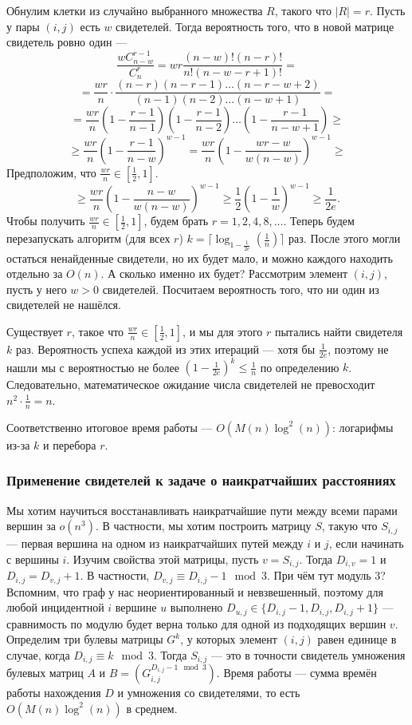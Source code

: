 Обнулим клетки из случайно выбранного множества $R$, такого что $|R| = r$.
Пусть у пары $(i, j)$ есть $w$ свидетелей.
Тогда вероятность того, что в новой матрице свидетель ровно один ---
\[
    \frac{w C_{n-w}^{r-1}}{C_n^r} = wr \frac{(n-w)! (n-r)!}{n! (n-w-r+1)!} = 
\]
\[
    = \frac{wr}{n} \cdot \frac{(n-r)(n-r-1) \dots (n-r-w+2)}{(n-1)(n-2) \dots (n-w+1)} =
\]
\[
    = \frac{wr}{n} \left(1 - \frac{r-1}{n-1} \right) \left(1 - \frac{r-1}{n-2} \right) \dots \left(1 - \frac{r-1}{n-w+1} \right) \ge
\]
\[
    \ge \frac{wr}{n} \left(1 - \frac{r-1}{n-w} \right)^{w-1} = \frac{wr}{n} \left( 1 - \frac{wr - w}{w(n - w)} \right)^{w - 1} \ge
\]
Предположим, что $\frac{wr}{n} \in \left[ \frac{1}{2}, 1 \right]$.
\[
    \ge \frac{wr}{n} \left( 1 - \frac{n - w}{w(n - w)} \right)^{w-1} \ge \frac{1}{2} \left(1 - \frac{1}{w} \right)^{w-1} \ge \frac{1}{2e}.
\]
Чтобы получить $\frac{wr}{n} \in \left[ \frac{1}{2}, 1 \right]$, будем брать $r = 1, 2, 4, 8, \dots$.
Теперь будем перезапускать алгоритм (для всех $r$) $k = \lceil \log_{1 - \frac{1}{2e}} \left( \frac{1}{n} \right) \rceil$ раз.
После этого могли остаться ненайденные свидетели, но их будет мало, и можно каждого находить отдельно за $O(n)$.
А сколько именно их будет?
Рассмотрим элемент $(i, j)$, пусть у него $w > 0$ свидетелей.
Посчитаем вероятность того, что ни один из свидетелей не нашёлся.

Существует $r$, такое что $\frac{wr}{n} \in \left[ \frac{1}{2}, 1 \right]$, и мы для этого $r$ пытались найти свидетеля $k$ раз.
Вероятность успеха каждой из этих итераций --- хотя бы $\frac{1}{2e}$, поэтому не нашли мы с вероятностью не более $\left(1 - \frac{1}{2e} \right)^k \le \frac{1}{n}$ по определению $k$.
Следовательно, математическое ожидание числа свидетелей не превосходит $n^2 \cdot \frac{1}{n} = n$.

Соответственно итоговое время работы --- $O(M(n) \log^2(n))$: логарифмы из-за $k$ и перебора $r$.

\subsubsection{Применение свидетелей к задаче о наикратчайших расстояниях}
Мы хотим научиться восстанавливать наикратчайшие пути между всеми парами вершин за $o(n^3)$.
В частности, мы хотим построить матрицу $S$, такую что $S_{i,j}$ --- первая вершина на одном из наикратчайших путей между $i$ и $j$, если начинать с вершины $i$.
Изучим свойства этой матрицы, пусть $v = S_{i,j}$.
Тогда $D_{i,v} = 1$ и $D_{i,j} = D_{v,j} + 1$.
В частности, $D_{v,j} \equiv D_{i,j} - 1 \mod 3$.
При чём тут модуль 3?
Вспомним, что граф у нас неориентированный и невзвешенный, поэтому для любой инцидентной $i$ вершине $u$ выполнено $D_{u,j} \in \{D_{i,j} - 1, D_{i,j}, D_{i,j} + 1\}$ --- сравнимость по модулю будет верна только для одной из подходящих вершин $v$.
Определим три булевы матрицы $G^k$, у которых элемент $(i, j)$ равен единице в случае, когда $D_{i,j} \equiv k \mod 3$.
Тогда $S_{i,j}$ --- это в точности свидетель умножения булевых матриц $A$ и $B = (G_{i,j}^{D_{i,j} - 1 \mod 3})$.
Время работы --- сумма времён работы нахождения $D$ и умножения со свидетелями, то есть $O(M(n) \log^2(n))$ в среднем.
